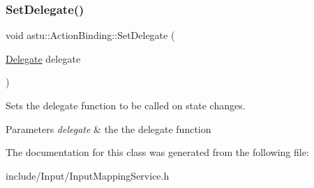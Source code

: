 \subsubsection{\texorpdfstring{Set\+Delegate()}{SetDelegate()}}
{\footnotesize\ttfamily void astu\+::\+Action\+Binding\+::\+Set\+Delegate (\begin{DoxyParamCaption}\item[{\hyperlink{classastu_1_1ActionBinding_ab0e27e5c54f264cb2aa36f65ead9e4ae}{Delegate}}]{delegate }\end{DoxyParamCaption})}

Sets the delegate function to be called on state changes.


\begin{DoxyParams}{Parameters}
{\em delegate} & the the delegate function \\
\hline
\end{DoxyParams}


The documentation for this class was generated from the following file\+:\begin{DoxyCompactItemize}
\item 
include/\+Input/Input\+Mapping\+Service.\+h\end{DoxyCompactItemize}
